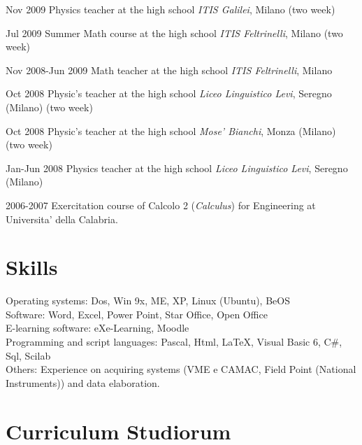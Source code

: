 \begin{CV}
	\item[Nov 2009] Physics teacher at the high school {\em ITIS Galilei}, Milano (two week)
	
	\item[Jul 2009] Summer Math course at the high school {\em ITIS Feltrinelli}, Milano (two week)
	
	\item[Nov 2008-Jun 2009] Math teacher at the high school {\em ITIS Feltrinelli}, Milano
	
	\item[Oct 2008] Physic's teacher at the high school {\em Liceo Linguistico Levi}, Seregno (Milano) (two week)
	
	\item[Oct 2008] Physic's teacher at the high school {\em Mose' Bianchi}, Monza (Milano) (two week)
	
	\item[Jan-Jun 2008] Physics teacher at the high school {\em Liceo Linguistico Levi}, Seregno (Milano)
	
	\item[2006-2007] Exercitation course of Calcolo 2 ({\em Calculus}) for Engineering at Universita' della Calabria.
	
\end{CV}

\section{Skills}

Operating systems: Dos, Win 9x, ME, XP, Linux (Ubuntu), BeOS\\
Software: Word, Excel, Power Point, Star Office, Open Office\\
E-learning software: eXe-Learning, Moodle\\
Programming and script languages: Pascal, Html, \LaTeX, Visual Basic 6, C\#, Sql, Scilab\\
Others: Experience on acquiring systems (VME e CAMAC, Field Point (National Instruments)) and data elaboration.

\section{Curriculum Studiorum}


